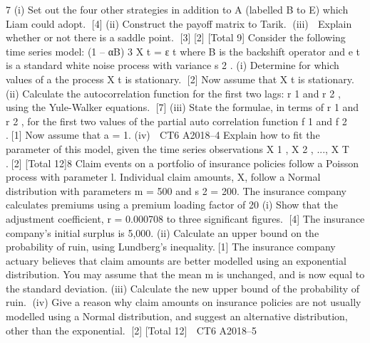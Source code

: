 \documentclass[a4paper,12pt]{article}
\begin{document}
 
7
(i) Set out the four other strategies in addition to A (labelled B to E) which Liam
could adopt.
[4]
(ii) Construct the payoff matrix to Tarik.
(iii)
 Explain whether or not there is a saddle point.
[3]
[2]
[Total 9]
Consider the following time series model:
(1 – αB) 3 X t = ε t
where B is the backshift operator and e t is a standard white noise process with
variance s 2 .
(i)
Determine for which values of a the process X t is stationary.
[2]
Now assume that X t is stationary.
(ii) Calculate the autocorrelation function for the first two lags: r 1 and r 2 , using
the Yule-Walker equations.
[7]
(iii) State the formulae, in terms of r 1 and r 2 , for the first two values of the partial
auto correlation function f 1 and f 2 .[1]
Now assume that a = 1.
(iv)

CT6 A2018–4
Explain how to fit the parameter of this model, given the time series
observations X 1 , X 2 , ..., X T .[2]
[Total 12]8
Claim events on a portfolio of insurance policies follow a Poisson process with
parameter l. Individual claim amounts, X, follow a Normal distribution with
parameters m = 500 and s 2 = 200.
The insurance company calculates premiums using a premium loading factor of 20%
(i)
Show that the adjustment coefficient, r = 0.000708 to three significant figures.
[4]
The insurance company’s initial surplus is 5,000.
(ii)
Calculate an upper bound on the probability of ruin, using Lundberg’s
inequality.[1]
The insurance company actuary believes that claim amounts are better modelled using
an exponential distribution. You may assume that the mean m is unchanged, and is
now equal to the standard deviation.
(iii) Calculate the new upper bound of the probability of ruin.
(iv) Give a reason why claim amounts on insurance policies are not usually
modelled using a Normal distribution, and suggest an alternative distribution,
other than the exponential.
[2]
[Total 12]

CT6 A2018–5 
\end{document}
